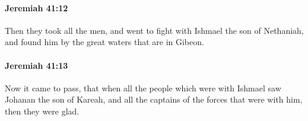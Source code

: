		\paragraph{Jeremiah 41:12} %
			\label{JEREMIAH-41-12}

			Then they took all the men, and went to fight with Ishmael the son of Nethaniah, and found him by the great waters that are in Gibeon.


		\paragraph{Jeremiah 41:13} %
			\label{JEREMIAH-41-13}

			Now it came to pass, that when all the people which were with Ishmael saw Johanan the son of Kareah, and all the captains of the forces that were with him, then they were glad.


